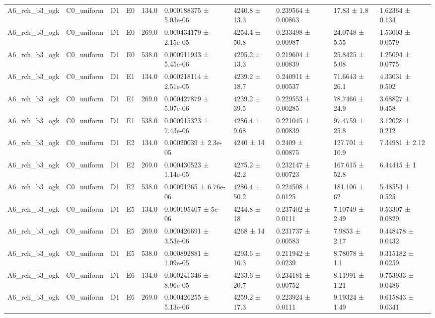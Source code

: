 \begin{table}
\begin{tabular}{llllllllll}
A6\_rch\_b3\_ogk & C0\_uniform & D1 & E0 & 134.0 & 0.000188375 ± 5.03e-06 & 4240.8 ± 13.3 & 0.239564 ± 0.00863 & 17.83 ± 1.8 & 1.62364 ± 0.134 \\
A6\_rch\_b3\_ogk & C0\_uniform & D1 & E0 & 269.0 & 0.000434179 ± 2.15e-05 & 4254.4 ± 50.8 & 0.233498 ± 0.00987 & 24.0748 ± 5.55 & 1.53003 ± 0.0579 \\
A6\_rch\_b3\_ogk & C0\_uniform & D1 & E0 & 538.0 & 0.000911933 ± 5.45e-06 & 4295.2 ± 13.3 & 0.219604 ± 0.00839 & 25.8425 ± 5.08 & 1.25094 ± 0.0775 \\
A6\_rch\_b3\_ogk & C0\_uniform & D1 & E1 & 134.0 & 0.000218114 ± 2.51e-05 & 4239.2 ± 18.7 & 0.240911 ± 0.00537 & 71.6643 ± 26.1 & 4.33031 ± 0.502 \\
A6\_rch\_b3\_ogk & C0\_uniform & D1 & E1 & 269.0 & 0.000427879 ± 5.07e-06 & 4239.2 ± 39.5 & 0.229553 ± 0.00285 & 78.7466 ± 24.9 & 3.68827 ± 0.458 \\
A6\_rch\_b3\_ogk & C0\_uniform & D1 & E1 & 538.0 & 0.000915323 ± 7.43e-06 & 4286.4 ± 9.68 & 0.221045 ± 0.00839 & 97.4759 ± 25.8 & 3.12028 ± 0.212 \\
A6\_rch\_b3\_ogk & C0\_uniform & D1 & E2 & 134.0 & 0.00020039 ± 2.3e-05 & 4240 ± 14 & 0.2409 ± 0.00875 & 127.701 ± 10.9 & 7.34981 ± 2.12 \\
A6\_rch\_b3\_ogk & C0\_uniform & D1 & E2 & 269.0 & 0.000430523 ± 1.14e-05 & 4275.2 ± 42.2 & 0.232147 ± 0.00723 & 167.615 ± 52.8 & 6.44415 ± 1 \\
A6\_rch\_b3\_ogk & C0\_uniform & D1 & E2 & 538.0 & 0.00091265 ± 6.76e-06 & 4286.4 ± 50.2 & 0.224508 ± 0.0125 & 181.106 ± 62 & 5.48554 ± 0.525 \\
A6\_rch\_b3\_ogk & C0\_uniform & D1 & E5 & 134.0 & 0.000195407 ± 5e-06 & 4244.8 ± 18 & 0.237402 ± 0.0111 & 7.10749 ± 2.49 & 0.53307 ± 0.0829 \\
A6\_rch\_b3\_ogk & C0\_uniform & D1 & E5 & 269.0 & 0.000426691 ± 3.53e-06 & 4268 ± 14 & 0.231737 ± 0.00583 & 7.9853 ± 2.17 & 0.448478 ± 0.0432 \\
A6\_rch\_b3\_ogk & C0\_uniform & D1 & E5 & 538.0 & 0.000892881 ± 1.09e-05 & 4293.6 ± 16.3 & 0.211942 ± 0.0239 & 8.78078 ± 1.1 & 0.315182 ± 0.0259 \\
A6\_rch\_b3\_ogk & C0\_uniform & D1 & E6 & 134.0 & 0.000241346 ± 8.96e-05 & 4233.6 ± 20.7 & 0.234181 ± 0.00752 & 8.11991 ± 1.21 & 0.753933 ± 0.0486 \\
A6\_rch\_b3\_ogk & C0\_uniform & D1 & E6 & 269.0 & 0.000426255 ± 5.13e-06 & 4259.2 ± 17.3 & 0.223924 ± 0.0111 & 9.19324 ± 1.49 & 0.615843 ± 0.0341 \\

\end{tabular}
\end{table}
